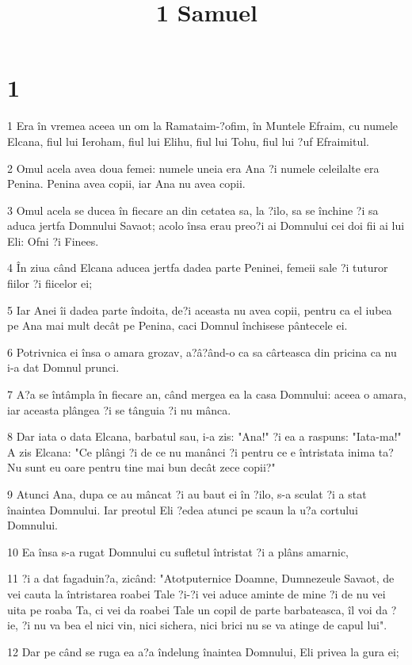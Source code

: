 

\title{1 Samuel}


\chapter{1}

\par 1 Era în vremea aceea un om la Ramataim-?ofim, în Muntele Efraim, cu numele Elcana, fiul lui Ieroham, fiul lui Elihu, fiul lui Tohu, fiul lui ?uf Efraimitul.
\par 2 Omul acela avea doua femei: numele uneia era Ana ?i numele celeilalte era Penina. Penina avea copii, iar Ana nu avea copii.
\par 3 Omul acela se ducea în fiecare an din cetatea sa, la ?ilo, sa se închine ?i sa aduca jertfa Domnului Savaot; acolo însa erau preo?i ai Domnului cei doi fii ai lui Eli: Ofni ?i Finees.
\par 4 În ziua când Elcana aducea jertfa dadea parte Peninei, femeii sale ?i tuturor fiilor ?i fiicelor ei;
\par 5 Iar Anei îi dadea parte îndoita, de?i aceasta nu avea copii, pentru ca el iubea pe Ana mai mult decât pe Penina, caci Domnul închisese pântecele ei.
\par 6 Potrivnica ei însa o amara grozav, a?â?ând-o ca sa cârteasca din pricina ca nu i-a dat Domnul prunci.
\par 7 A?a se întâmpla în fiecare an, când mergea ea la casa Domnului: aceea o amara, iar aceasta plângea ?i se tânguia ?i nu mânca.
\par 8 Dar iata o data Elcana, barbatul sau, i-a zis: "Ana!" ?i ea a raspuns: "Iata-ma!" A zis Elcana: "Ce plângi ?i de ce nu manânci ?i pentru ce e întristata inima ta? Nu sunt eu oare pentru tine mai bun decât zece copii?"
\par 9 Atunci Ana, dupa ce au mâncat ?i au baut ei în ?ilo, s-a sculat ?i a stat înaintea Domnului. Iar preotul Eli ?edea atunci pe scaun la u?a cortului Domnului.
\par 10 Ea însa s-a rugat Domnului cu sufletul întristat ?i a plâns amarnic,
\par 11 ?i a dat fagaduin?a, zicând: "Atotputernice Doamne, Dumnezeule Savaot, de vei cauta la întristarea roabei Tale ?i-?i vei aduce aminte de mine ?i de nu vei uita pe roaba Ta, ci vei da roabei Tale un copil de parte barbateasca, îl voi da ?ie, ?i nu va bea el nici vin, nici sichera, nici brici nu se va atinge de capul lui".
\par 12 Dar pe când se ruga ea a?a îndelung înaintea Domnului, Eli privea la gura ei;
